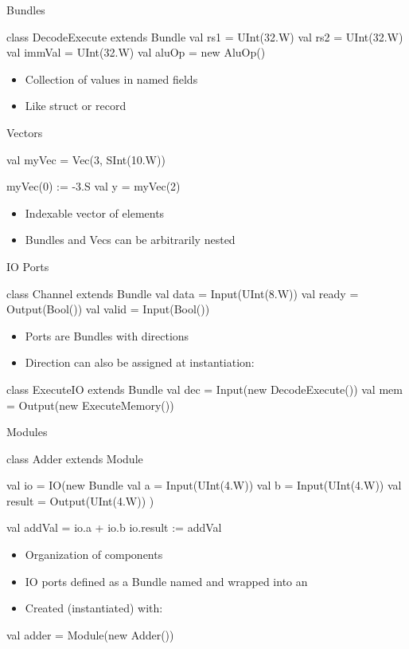 \begin{frame}[fragile]{Bundles}
\begin{chisel}
class DecodeExecute extends Bundle {
  val rs1 = UInt(32.W)
  val rs2 = UInt(32.W)
  val immVal = UInt(32.W)
  val aluOp = new AluOp()
}
\end{chisel}
\begin{itemize}
\item Collection of values in named fields 
\item Like struct or record
\end{itemize}
\end{frame}

\begin{frame}[fragile]{Vectors}
\begin{chisel}
val myVec = Vec(3, SInt(10.W))

myVec(0) := -3.S
val y = myVec(2)
\end{chisel}
\begin{itemize}
\item Indexable vector of elements
\item Bundles and Vecs can be arbitrarily nested
\end{itemize}
\end{frame}

\begin{frame}[fragile]{IO Ports}
\begin{chisel}
class Channel extends Bundle {
  val data = Input(UInt(8.W))
  val ready = Output(Bool())
  val valid = Input(Bool())
}
\end{chisel}
\begin{itemize}
\item Ports are Bundles with directions
\item Direction can also be assigned at instantiation:
\end{itemize}
\begin{chisel}
class ExecuteIO extends Bundle {
  val dec = Input(new DecodeExecute())
  val mem = Output(new ExecuteMemory())
}
\end{chisel}
\end{frame}

\begin{frame}[fragile]{Modules}
\begin{chisel}
class Adder extends Module {
  val io = IO(new Bundle {
    val a = Input(UInt(4.W))
    val b = Input(UInt(4.W))
    val result = Output(UInt(4.W))
  })

  val addVal = io.a + io.b
  io.result := addVal
}
\end{chisel}
\begin{itemize}
\item Organization of components
\item IO ports defined as a Bundle named  and wrapped into an 
\item Created (instantiated) with:
\end{itemize}
\begin{chisel}
val adder = Module(new Adder())
\end{chisel}
\end{frame}

